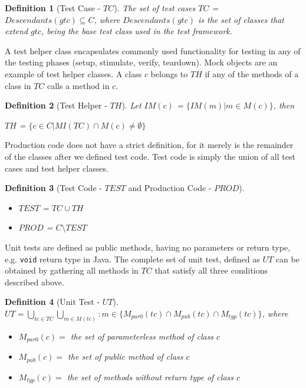 \documentclass{uvamscse}
\newtheorem{definition}{Definition}[section]
\begin{document}
\begin{definition}[Test Case - $TC$] 
	\label{def:tc}
	The set of test cases $TC$ = $Descendants(gtc) \subseteq C$, where $Descendants(gtc)$ is the set of classes that extend $gtc$, being the base test class used in the test framework. 
\end{definition}

A test helper class encapsulates commonly used functionality for testing in any of the testing phases (setup, stimulate, verify, teardown). Mock objects are an example of test helper classes. A class $c$ belongs to $TH$ if any of the methods of a class in $TC$ calls a method in $c$.

\begin{definition}[Test Helper - $TH$]
	
	Let $IM(c)$ = $\{IM(m) | m \in M(c) \}$, then
	
	$TH$ = $\{c \in C | MI(TC) \cap M(c) \neq \emptyset\}$
\end{definition}

Production code does not have a strict definition, for it merely is the remainder of the classes after we defined test code. Test code is simply the union of all test cases and test helper classes. 

\begin{definition}[Test Code - $TEST$ and Production Code - $PROD$] \hspace{1em}
	\label{def:TESTandPROD} 
	\begin{itemize}
		\item $TEST$ = $TC \cup TH$
		\item $PROD$ = $C \setminus TEST$
	\end{itemize}
	
\end{definition}

Unit tests are defined as public methods, having no parameters or return type, e.g. \texttt{void} return type in Java. The complete set of unit test, defined as $UT$ can be obtained by gathering all methods in $TC$ that satisfy all three conditions described above.

\begin{definition}[Unit Test - $UT$] \hspace{1em} \\
	\label{def:unitTest}
	$UT = \bigcup_{tc \in TC} \bigcup_{m \in M(tc)} : m \in \{M_{par0}(tc) \cap M_{pub}(tc) \cap M_{typ}(tc)\}$, where
	\begin{itemize}
		\item $M_{par0}(c) =$ the set of parameterless method of class $c$
		\item $M_{pub}(c) = $ the set of public method of class $c$
		\item $M_{typ}(c) = $ the set of methods without return type of class $c$
	\end{itemize}
\end{definition} 
\end{document}
